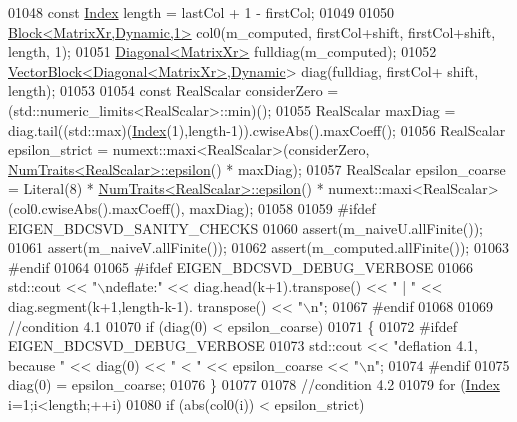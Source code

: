 \begin{DoxyCode}
01048   \textcolor{keyword}{const} \hyperlink{namespace_eigen_a62e77e0933482dafde8fe197d9a2cfde}{Index} length = lastCol + 1 - firstCol;
01049   
01050   \hyperlink{group___core___module_class_eigen_1_1_block}{Block<MatrixXr,Dynamic,1>} col0(m\_computed, firstCol+shift, firstCol+shift, 
      length, 1);
01051   \hyperlink{group___core___module_class_eigen_1_1_diagonal}{Diagonal<MatrixXr>} fulldiag(m\_computed);
01052   \hyperlink{group___core___module_class_eigen_1_1_vector_block}{VectorBlock<Diagonal<MatrixXr>},\hyperlink{namespace_eigen_ad81fa7195215a0ce30017dfac309f0b2}{Dynamic}> diag(fulldiag, firstCol+
      shift, length);
01053   
01054   \textcolor{keyword}{const} RealScalar considerZero = (std::numeric\_limits<RealScalar>::min)();
01055   RealScalar maxDiag = diag.tail((std::max)(\hyperlink{namespace_eigen_a62e77e0933482dafde8fe197d9a2cfde}{Index}(1),length-1)).cwiseAbs().maxCoeff();
01056   RealScalar epsilon\_strict = numext::maxi<RealScalar>(considerZero,
      \hyperlink{group___core___module_struct_eigen_1_1_num_traits}{NumTraits<RealScalar>::epsilon}() * maxDiag);
01057   RealScalar epsilon\_coarse = Literal(8) * \hyperlink{group___core___module_struct_eigen_1_1_num_traits}{NumTraits<RealScalar>::epsilon}() *
       numext::maxi<RealScalar>(col0.cwiseAbs().maxCoeff(), maxDiag);
01058   
01059 \textcolor{preprocessor}{#ifdef EIGEN\_BDCSVD\_SANITY\_CHECKS}
01060   assert(m\_naiveU.allFinite());
01061   assert(m\_naiveV.allFinite());
01062   assert(m\_computed.allFinite());
01063 \textcolor{preprocessor}{#endif}
01064 
01065 \textcolor{preprocessor}{#ifdef  EIGEN\_BDCSVD\_DEBUG\_VERBOSE  }
01066   std::cout << \textcolor{stringliteral}{"\(\backslash\)ndeflate:"} << diag.head(k+1).transpose() << \textcolor{stringliteral}{"  |  "} << diag.segment(k+1,length-k-1).
      transpose() << \textcolor{stringliteral}{"\(\backslash\)n"};
01067 \textcolor{preprocessor}{#endif}
01068   
01069   \textcolor{comment}{//condition 4.1}
01070   \textcolor{keywordflow}{if} (diag(0) < epsilon\_coarse)
01071   \{ 
01072 \textcolor{preprocessor}{#ifdef  EIGEN\_BDCSVD\_DEBUG\_VERBOSE}
01073     std::cout << \textcolor{stringliteral}{"deflation 4.1, because "} << diag(0) << \textcolor{stringliteral}{" < "} << epsilon\_coarse << \textcolor{stringliteral}{"\(\backslash\)n"};
01074 \textcolor{preprocessor}{#endif}
01075     diag(0) = epsilon\_coarse;
01076   \}
01077 
01078   \textcolor{comment}{//condition 4.2}
01079   \textcolor{keywordflow}{for} (\hyperlink{namespace_eigen_a62e77e0933482dafde8fe197d9a2cfde}{Index} i=1;i<length;++i)
01080     \textcolor{keywordflow}{if} (abs(col0(i)) < epsilon\_strict)

\end{DoxyCode}

